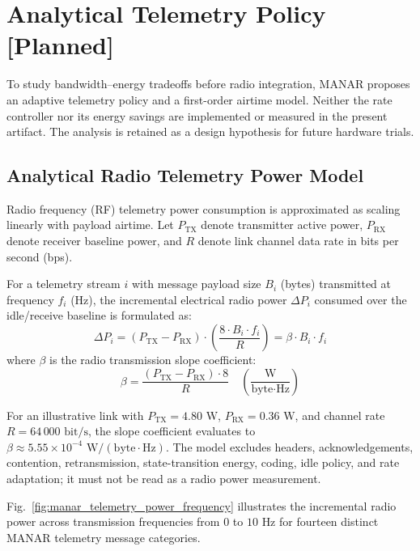 \section{Analytical Telemetry Policy [Planned]}

To study bandwidth--energy tradeoffs before radio integration, MANAR proposes an adaptive telemetry policy and a first-order airtime model. Neither the rate controller nor its energy savings are implemented or measured in the present artifact. The analysis is retained as a design hypothesis for future hardware trials.

\subsection{Analytical Radio Telemetry Power Model}
Radio frequency (RF) telemetry power consumption is approximated as scaling linearly with payload airtime. Let $P_{\mathrm{TX}}$ denote transmitter active power, $P_{\mathrm{RX}}$ denote receiver baseline power, and $R$ denote link channel data rate in bits per second (bps).

For a telemetry stream $i$ with message payload size $B_i$ (bytes) transmitted at frequency $f_i$ (Hz), the incremental electrical radio power $\Delta P_i$ consumed over the idle/receive baseline is formulated as:
\begin{equation}
\Delta P_i = (P_{\mathrm{TX}} - P_{\mathrm{RX}}) \cdot \left(\frac{8 \cdot B_i \cdot f_i}{R}\right) = \beta \cdot B_i \cdot f_i
\end{equation}
where $\beta$ is the radio transmission slope coefficient:
\begin{equation}
\beta = \frac{(P_{\mathrm{TX}} - P_{\mathrm{RX}}) \cdot 8}{R} \quad \left(\frac{\text{W}}{\text{byte} \cdot \text{Hz}}\right)
\end{equation}

For an illustrative link with $P_{\mathrm{TX}} = 4.80\text{ W}$, $P_{\mathrm{RX}} = 0.36\text{ W}$, and channel rate $R = 64\,000\text{ bit/s}$, the slope coefficient evaluates to $\beta \approx 5.55 \times 10^{-4}\text{ W}/(\text{byte}\cdot\text{Hz})$. The model excludes headers, acknowledgements, contention, retransmission, state-transition energy, coding, idle policy, and rate adaptation; it must not be read as a radio power measurement.

Fig.~\ref{fig:manar_telemetry_power_frequency} illustrates the incremental radio power across transmission frequencies from $0$ to $10\text{ Hz}$ for fourteen distinct MANAR telemetry message categories.

